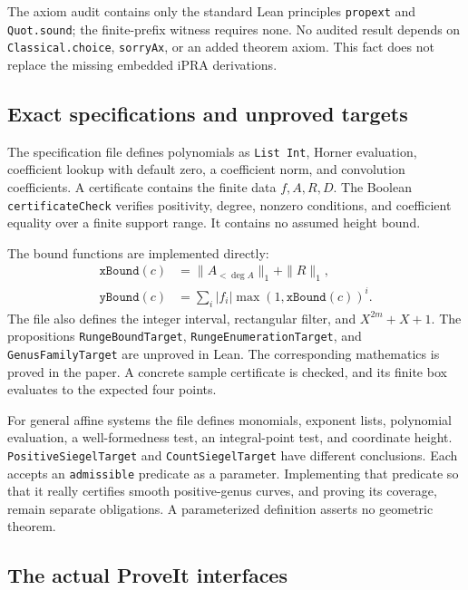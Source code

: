 The axiom audit contains only the standard Lean principles
\texttt{propext} and \texttt{Quot.sound}; the finite-prefix witness
requires none. No audited result depends on \texttt{Classical.choice},
\texttt{sorryAx}, or an added theorem axiom. This fact does not replace
the missing embedded iPRA derivations.

\subsection{Exact specifications and unproved targets}

The specification file defines polynomials as \texttt{List Int},
Horner evaluation, coefficient lookup with default zero, a coefficient
norm, and convolution coefficients. A certificate contains the finite
data $f,A,R,D$. The Boolean \texttt{certificateCheck} verifies positivity,
degree, nonzero conditions, and coefficient equality over a finite
support range. It contains no assumed height bound.

The bound functions are implemented directly:
\[
\begin{split}
\texttt{xBound}(c)&=\|A_{<\deg A}\|_1+\|R\|_1,\\
\texttt{yBound}(c)&=\sum_i |f_i|\max(1,\texttt{xBound}(c))^i.
\end{split}
\]
The file also defines the integer interval, rectangular filter, and
$X^{2m}+X+1$. The propositions \texttt{RungeBoundTarget},
\texttt{RungeEnumerationTarget}, and \texttt{GenusFamilyTarget}
are unproved in Lean. The corresponding mathematics is proved in
the paper. A concrete sample certificate is checked, and its finite
box evaluates to the expected four points.

For general affine systems the file defines monomials, exponent lists,
polynomial evaluation, a well-formedness test, an integral-point test,
and coordinate height. \texttt{PositiveSiegelTarget} and
\texttt{CountSiegelTarget} have different conclusions. Each accepts an
\texttt{admissible} predicate as a parameter. Implementing that
predicate so that it really certifies smooth positive-genus curves,
and proving its coverage, remain separate obligations. A parameterized
definition asserts no geometric theorem.

\subsection{The actual ProveIt interfaces}

